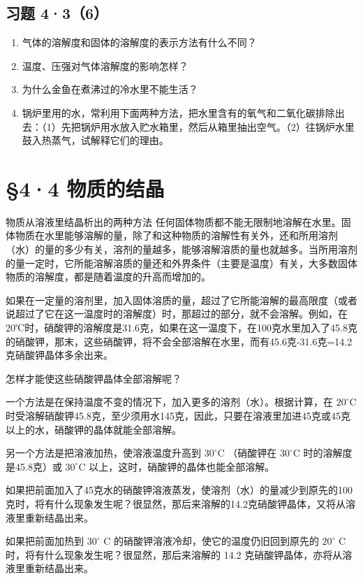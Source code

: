 \subsection{习题 4·3（6）}

\begin{enumerate}
\item
  气体的溶解度和固体的溶解度的表示方法有什么不同？
\item
  温度、压强对气体溶解度的影响怎样？
\item
  为什么金鱼在煮沸过的冷水里不能生活？
\item
  锅炉里用的水，常利用下面两种方法，把水里含有的氧气和二氧化碳排除出去：（1）先把锅炉用水放入贮水箱里，然后从箱里抽出空气。（2）往锅炉水里鼓入热蒸气，试解释它们的理由。
\end{enumerate}

\section{§4·4 物质的结晶}

物质从溶液里结晶析出的两种方法
任何固体物质都不能无限制地溶解在水里。固体物质在水里能够溶解的量，除了和这种物质的溶解性有关外，还和所用溶剂（水）的量的多少有关，溶剂的量越多，能够溶解溶质的量也就越多。当所用溶剂的量一定时，它所能溶解溶质的量还和外界条件（主要是温度）有关，大多数固体物质的溶解度，都是随着温度的升高而增加的。

如果在一定量的溶剂里，加入固体溶质的量，超过了它所能溶解的最高限度（或者说超过了它在这一温度时的溶解度）时，那超过的部分，就不会溶解。例如，在20℃时，硝酸钾的溶解度是31.6克，如果在这一温度下，在100克水里加入了45.8克的硝酸钾，那末，这些硝酸钾，将不会全部溶解在水里，而有45.6克-31.6克=14.2克硝酸钾晶体多余出来。

怎样才能使这些硝酸钾晶体全部溶解呢？

一个方法是在保持温度不变的情况下，加入更多的溶剂（水）。根据计算，在
\(20^{\circ}\mathrm{C}\)
时受溶解硝酸钾45.8克，至少须用水145克，因此，只要在溶液里加进45克或45克以上的水，硝酸钾的晶体就能全部溶解。

另一个方法是把溶液加热，使溶液温度升高到 \(30^{\circ}\mathrm{C}\)
（硝酸钾在 \(30^{\circ}\mathrm{C}\) 时的溶解度是45.8克）或
\(30^{\circ}\mathrm{C}\) 以上，这时，硝酸钾的晶体也能全部溶解。

如果把前面加入了45克水的硝酸钾溶液蒸发，使溶剂（水）的量减少到原先的100克时，将有什么现象发生呢？很显然，那后来溶解的14.2克硝酸钾晶体，又将从溶液里重新结晶出来。

如果把前面加热到 \(30^{\circ}\) C
的硝酸钾溶液冷却，使它的温度仍旧回到原先的 \(20^{\circ}\) C
时，将有什么现象发生呢？很显然，那后来溶解的 14.2
克硝酸钾晶体，亦将从溶液里重新结晶出来。

